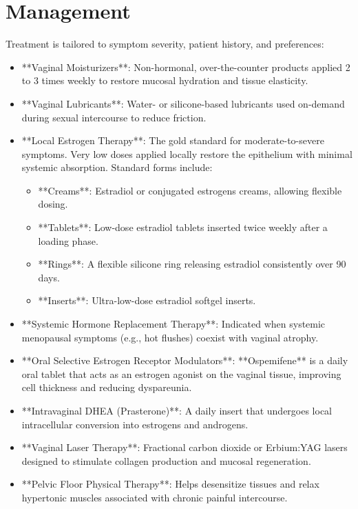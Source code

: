 \section*{Management}
Treatment is tailored to symptom severity, patient history, and preferences:
\begin{itemize}
\item **Vaginal Moisturizers**: Non-hormonal, over-the-counter products applied 2 to 3 times weekly to restore mucosal hydration and tissue elasticity.
\item **Vaginal Lubricants**: Water- or silicone-based lubricants used on-demand during sexual intercourse to reduce friction.
\item **Local Estrogen Therapy**: The gold standard for moderate-to-severe symptoms. Very low doses applied locally restore the epithelium with minimal systemic absorption. Standard forms include:
\begin{itemize}
\item **Creams**: Estradiol or conjugated estrogens creams, allowing flexible dosing.
\item **Tablets**: Low-dose estradiol tablets inserted twice weekly after a loading phase.
\item **Rings**: A flexible silicone ring releasing estradiol consistently over 90 days.
\item **Inserts**: Ultra-low-dose estradiol softgel inserts.
\end{itemize}
\item **Systemic Hormone Replacement Therapy**: Indicated when systemic menopausal symptoms (e.g., hot flushes) coexist with vaginal atrophy.
\item **Oral Selective Estrogen Receptor Modulators**: **Ospemifene** is a daily oral tablet that acts as an estrogen agonist on the vaginal tissue, improving cell thickness and reducing dyspareunia.
\item **Intravaginal DHEA (Prasterone)**: A daily insert that undergoes local intracellular conversion into estrogens and androgens.
\item **Vaginal Laser Therapy**: Fractional carbon dioxide or Erbium:YAG lasers designed to stimulate collagen production and mucosal regeneration.
\item **Pelvic Floor Physical Therapy**: Helps desensitize tissues and relax hypertonic muscles associated with chronic painful intercourse.
\end{itemize}

